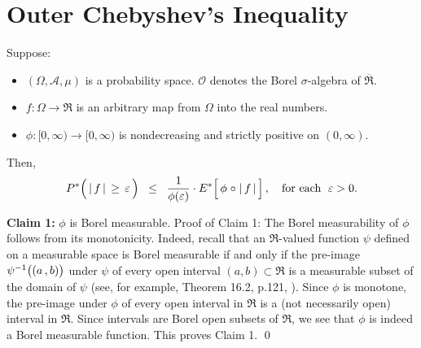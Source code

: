 

\section{Outer Chebyshev's Inequality}
\setcounter{theorem}{0}
\setcounter{equation}{0}


\renewcommand{\theenumi}{\roman{enumi}}
\renewcommand{\labelenumi}{\textnormal{(\theenumi)}$\;\;$}


\begin{theorem}
\mbox{}\vskip 0.1cm
\noindent
Suppose:
\begin{itemize}
\item
	$(\Omega,\mathcal{A},\mu)$ is a probability space.
	$\mathcal{O}$ denotes the Borel $\sigma$-algebra of $\overline{\Re}$.
\item
	$f : \Omega \longrightarrow \Re$ is an arbitrary map from $\Omega$ into the real numbers.
\item
	$\phi : [0,\infty) \longrightarrow [0,\infty)$ is nondecreasing and strictly positive on $(0,\infty)$.
\end{itemize}
Then,
\begin{equation*}
P^{*}\!\left(\,\vert\,\overset{{\color{white}.}}{f}\,\vert\,\geq\,\varepsilon\,\right)
\;\;\leq\;\;
	\dfrac{1}{\phi(\varepsilon)} \cdot E^{*}\!\left[\,\phi\overset{{\color{white}-}}{\circ}\vert\,f\,\vert\,\right],
	\quad
	\textnormal{for each \;$\varepsilon > 0$}.
\end{equation*}
\end{theorem}
\proof

\vskip 0.5cm
\noindent
\textbf{Claim 1:}\;\; $\phi$ is Borel measurable.
\vskip 0.1cm
\noindent
Proof of Claim 1: The Borel measurability of $\phi$ follows from its monotonicity.
Indeed, recall that an $\Re$-valued function $\psi$ defined on a measurable space is Borel measurable
if and only if
the pre-image $\psi^{-1}\!\left((a\overset{{\color{white}-}}{,}b)\right)$ under $\psi$ of every open interval
$(a,b)\subset\Re$ is a measurable subset of the domain of $\psi$
(see, for example, Theorem 16.2, p.121, \cite{Aliprantis1998}).
Since $\phi$ is monotone, the pre-image under $\phi$ of every open interval in $\Re$ is a
(not necessarily open) interval in $\Re$.
Since intervals are Borel open subsets of $\Re$, we see that $\phi$ is indeed a Borel measurable function.
This proves Claim 1.
\qed



\renewcommand{\theenumi}{\roman{enumi}}
\renewcommand{\labelenumi}{\textnormal{(\theenumi)}$\;\;$}

